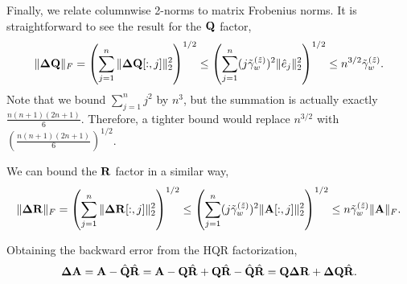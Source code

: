 Finally, we relate columnwise 2-norms to matrix Frobenius norms.
It is straightforward to see the result for the $\mathbf{Q}$ factor,
\begin{equation}
\|\mathbf{\Delta Q}\|_F = \left(\sum_{j=1}^n \|\mathbf{\Delta Q}[:,j]\|_2^2\right)^{1/2} \leq \left(\sum_{j=1}^n (j\tilde{\gamma}_w^{(\tilde{z})})^2 \|\hat{e}_j\|_2^2\right)^{1/2} \leq n^{3/2}\tilde{\gamma}_w^{(\tilde{z})}.
\end{equation}
Note that we bound $\sum_{j=1}^n j^2$ by $n^3$, but the summation is actually exactly $\frac{n(n+1)(2n+1)}{6}$. 
Therefore, a tighter bound would replace $n^{3/2}$ with $\left(\frac{n(n+1)(2n+1)}{6}\right)^{1/2}$.\par 
We can bound the $\mathbf{R}$ factor in a similar way,
\begin{equation}
\|\mathbf{\Delta R}\|_F = \left(\sum_{j=1}^n \|\mathbf{\Delta R}[:,j]\|_2^2\right)^{1/2} \leq \left(\sum_{j=1}^n (j\tilde{\gamma}_w^{(\tilde{z})})^2 \|\mathbf{A}[:,j]\|_2^2\right)^{1/2} \leq n\tilde{\gamma}_w^{(\tilde{z})} \|\mathbf{A}\|_F.
\end{equation}

Obtaining the backward error from the HQR factorization,
$$\mathbf{\Delta A}=\mathbf{A}-\hat{\mathbf{Q}}\hat{\mathbf{R}}
= \mathbf{A}-\mathbf{Q}\hat{\mathbf{R}} + \mathbf{Q}\hat{\mathbf{R}} - \hat{\mathbf{Q}}\hat{\mathbf{R}}
= \mathbf{Q \Delta R} + \mathbf{\Delta Q} \hat{\mathbf{R}}.$$
	
